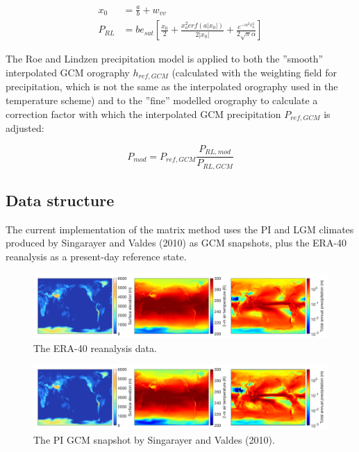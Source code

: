 \documentclass{article}
\begin{document}
\begin{align}
x_0 &= \frac{a}{b} + w_{vv} \\
P_{RL} &= b e_{sat} \left[ \frac{x_0}{2} + \frac{ x_o^2 erf( a |x_0| )}{2|x_0|} + \frac{e^{-\alpha^2 x_0^2}}{2 \sqrt{\pi} \alpha}\right]
\end{align}

The Roe and Lindzen precipitation model is applied to both the ''smooth'' interpolated GCM orography $h_{ref,GCM}$ (calculated with the weighting field for precipitation, which is not the same as the interpolated orography used in the temperature scheme) and to the ''fine'' modelled orography to calculate a correction factor with which the interpolated GCM precipitation $P_{ref,GCM}$ is adjusted:

\begin{equation}
P_{mod} = P_{ref,GCM} \frac{P_{RL,mod}}{P_{RL,GCM}}
\end{equation}

\newpage
\subsection{Data structure}

The current implementation of the matrix method uses the PI and LGM climates produced by Singarayer and Valdes (2010) as GCM snapshots, plus the ERA-40 reanalysis as a present-day reference state.

\begin{figure}[h!] \label{fig:climate_ERA40}
  \includegraphics[width=0.95\linewidth]{Fig_climate_ERA40.png}
  \caption{The ERA-40 reanalysis data.}
\end{figure}

\begin{figure}[h!] \label{fig:climate_GCM_PI}
  \includegraphics[width=0.95\linewidth]{Fig_climate_GCM_PI.png}
  \caption{The PI GCM snapshot by Singarayer and Valdes (2010).}
\end{figure}
\end{document}
